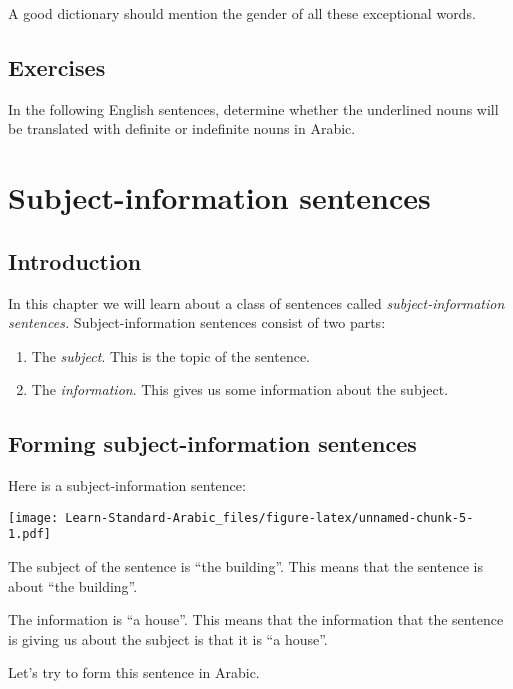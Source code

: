\documentclass[
  10pt,
]{book}
\providecommand{\tightlist}{%
  \setlength{\itemsep}{0pt}\setlength{\parskip}{0pt}}
\begin{document}
A good dictionary should mention the gender of all these exceptional words.

\section{Exercises}\label{exercises}

In the following English sentences, determine whether the underlined nouns will be translated with definite or indefinite nouns in Arabic.

\chapter{Subject-information sentences}\label{subject-information-sentences}

\section{Introduction}\label{introduction-2}

In this chapter we will learn about a class of sentences called \emph{subject-information sentences.}
Subject-information sentences consist of two parts:

\begin{enumerate}
\def\labelenumi{\roman{enumi}.}
\tightlist
\item
  The \emph{subject}. This is the topic of the sentence.
\item
  The \emph{information}. This gives us some information about the subject.
\end{enumerate}

\section{Forming subject-information sentences}\label{forming-subject-information-sentences}

Here is a subject-information sentence:

\texttt{[image: Learn-Standard-Arabic\_files/figure-latex/unnamed-chunk-5-1.pdf]}

The subject of the sentence is \enquote{the building}. This means that the sentence is about \enquote{the building}.

The information is \enquote{a house}. This means that the information that the sentence is giving us about the subject is that it is \enquote{a house}.

Let's try to form this sentence in Arabic.
\end{document}
